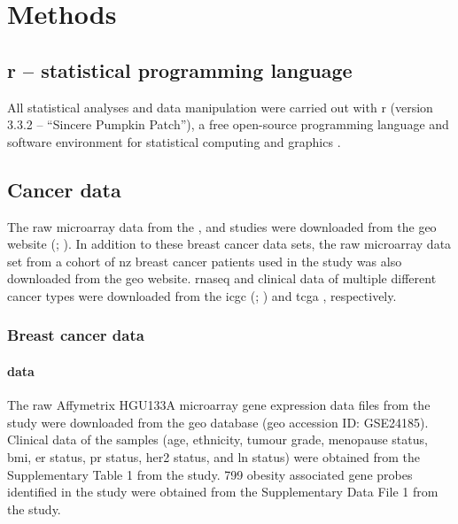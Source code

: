 \chapter{Methods}
\label{ch:methods}

\section{\gls{r} -- statistical programming language}
\label{sec:r}

All statistical analyses and data manipulation were carried out with \gls{r} (version 3.3.2 -- ``Sincere Pumpkin Patch''), a free open-source programming language and software environment for statistical computing and graphics \citep{R2016}.

\section{Cancer data}
\label{sec:data}

The raw microarray data from the \citet{Creighton2012}, \citet{Fuentes-Mattei2014} and \citet{Gatza2010a}  studies were downloaded from the \gls{geo} website (\citealp{Edgar2002}; ).
In addition to these breast cancer data sets, the raw microarray data set from a cohort of \gls{nz} breast cancer patients used in the \citet{Print2016} study was also downloaded from the \gls{geo} website.
\gls{rnaseq} and clinical data of multiple different cancer types were downloaded from the \gls{icgc} (; \citealp{Zhang2011}) and \gls{tcga} , respectively.

\subsection{Breast cancer data}
\label{sub:breast_cancer_data}

\subsubsection{\citet{Creighton2012} data}
\label{ssub:creighton2012_data}

The raw Affymetrix HGU\-133A microarray gene expression data files from the \citet{Creighton2012} study were downloaded from the \gls{geo} database (\gls{geo} accession ID: GSE24185).
Clinical data of the samples (age, ethnicity, tumour grade, menopause status, \gls{bmi}, \gls{er} status, \gls{pr} status, \gls{her2} status, and \gls{ln} status) were obtained from the Supplementary Table 1 from the \citet{Creighton2012} study.
799 obesity associated gene probes identified in the \citet{Creighton2012} study were obtained from the Supplementary Data File 1 from the \citet{Creighton2012} study.

